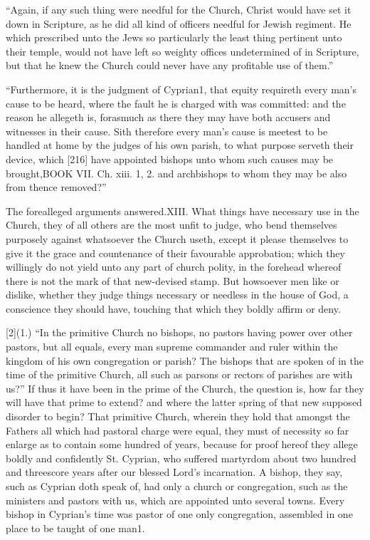“Again, if any such thing were needful for the Church, Christ would have set it down in Scripture, as he did all kind of officers needful for Jewish regiment. He which prescribed unto the Jews so particularly the least thing pertinent unto their temple, would not have left so weighty offices undetermined of in Scripture, but that he knew the Church could never have any profitable use of them.”

“Furthermore, it is the judgment of Cyprian1, that equity requireth every man’s cause to be heard, where the fault he is charged with was committed: and the reason he allegeth is, forasmuch as there they may have both accusers and witnesses in their cause. Sith therefore every man’s cause is meetest to be handled at home by the judges of his own parish, to what purpose serveth their device, which [216] have appointed bishops unto whom such causes may be brought,BOOK VII. Ch. xiii. 1, 2. and archbishops to whom they may be also from thence removed?”

The forealleged arguments answered.XIII. What things have necessary use in the Church, they of all others are the most unfit to judge, who bend themselves purposely against whatsoever the Church useth, except it please themselves to give it the grace and countenance of their favourable approbation; which they willingly do not yield unto any part of church polity, in the forehead whereof there is not the mark of that new-devised stamp. But howsoever men like or dislike, whether they judge things necessary or needless in the house of God, a conscience they should have, touching that which they boldly affirm or deny.

[2](1.) “In the primitive Church no bishops, no pastors having power over other pastors, but all equals, every man supreme commander and ruler within the kingdom of his own congregation or parish? The bishops that are spoken of in the time of the primitive Church, all such as parsons or rectors of parishes are with us?” If thus it have been in the prime of the Church, the question is, how far they will have that prime to extend? and where the latter spring of that new supposed disorder to begin? That primitive Church, wherein they hold that amongst the Fathers all which had pastoral charge were equal, they must of necessity so far enlarge as to contain some hundred of years, because for proof hereof they allege boldly and confidently St. Cyprian, who suffered martyrdom about two hundred and threescore years after our blessed Lord’s incarnation. A bishop, they say, such as Cyprian doth speak of, had only a church or congregation, such as the ministers and pastors with us, which are appointed unto several towns. Every bishop in Cyprian’s time was pastor of one only congregation, assembled in one place to be taught of one man1.


